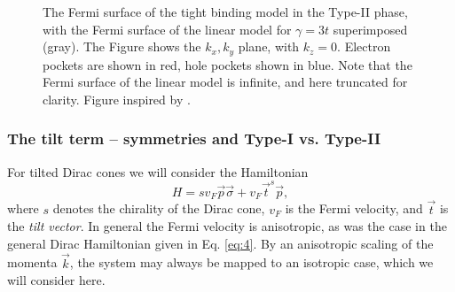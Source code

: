 \begin{figure}[htb]
  \caption{The Fermi surface of the tight binding model in the Type-II phase, with the Fermi surface of the linear model for \( \gamma=3t \) superimposed (gray).
    The Figure shows the \( k_x, k_y \) plane, with \( k_z = 0 \).
    Electron pockets are shown in red, hole pockets shown in blue.
    Note that the Fermi surface of the linear model is infinite, and here truncated for clarity.
  Figure inspired by \textcite{mccormickMinimalModelsTopological2017}.}
  \label{fig:fermiSurfaceTight}
\end{figure}


\subsubsection{The tilt term -- symmetries and Type-I vs.\! Type-II}
For tilted Dirac cones we will consider the Hamiltonian
\begin{equation}
  \label{eq:10}
  H =  s v_F \vec{p} \vec{\sigma} + v_F \vec{t}^s \vec{p},
\end{equation}
where \( s \) denotes the chirality of the Dirac cone, \( v_F \) is the Fermi velocity, and \( \vec{t} \) is the \emph{tilt vector}.
In general the Fermi velocity is anisotropic, as was the case in the general Dirac Hamiltonian given in Eq. \eqref{eq:4}.
By an anisotropic scaling of the momenta \( \vec{k} \), the system may always be mapped to an isotropic case, which we will consider here.

